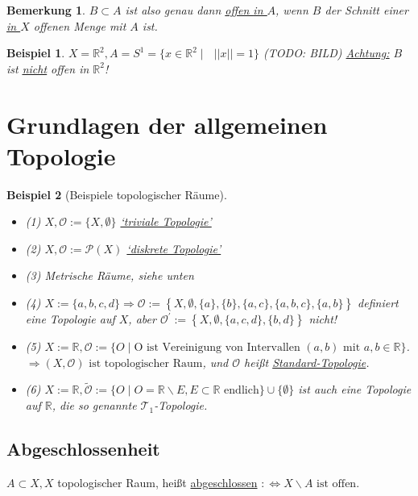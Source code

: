 \documentclass[a4paper,11pt,notitlepage]{report}
\newtheorem{definition}{Definition}[chapter]
\newtheorem{remark}{Bemerkung}[chapter]
\newtheorem{example}{Beispiel}[chapter]
\newcommand{\R}{{\ensuremath{\mathbb{R}}}}
\newcommand{\OO}{{\ensuremath{\mathcal{O}}}}
\newenvironment{Kasten}[1]
{
\hspace{0.05\linewidth}
\begin{center}
\begin{minipage}{0.9\linewidth}
\setlength{\fboxsep}{18pt}
\definecolor{shadecolor}{gray}{0.9}
\definecolor{framecolor}{gray}{0}
\def\FrameCommand{\fcolorbox{framecolor}{shadecolor}}
\MakeFramed {\FrameRestore}
\subsection{#1}
\begin{itshape}
}
{
\end{itshape}
\endMakeFramed
\end{minipage}
\end{center}
\vspace{1em}
}
\begin{document}
\begin{remark}
$B \subset A$ ist also genau dann \underline{offen \underline{in $A$}}, wenn $B$ der Schnitt einer \underline{in $X$} offenen Menge mit $A$ ist.
\end{remark}

\begin{example}
$X = \R^2, A = S^1 = \{ x \in \R^2 \mid \text{ } ||x|| = 1\}$ 
\newline
(TODO: BILD)
\newline
\underline{Achtung:} $B$ ist \underline{\underline{nicht}} offen in $\R^2$!
\end{example}

\section{Grundlagen der allgemeinen Topologie}
\begin{example}[Beispiele topologischer Räume]
	\begin{itemize}
		\item (1) $X, \OO := \{X, \emptyset\}$ \underline{`triviale Topologie'}
		\item (2) $X, \OO := \mathcal{P}(X)$ \underline{`diskrete Topologie'}
		\item (3) Metrische Räume, siehe unten
		\item (4) $X:= \{a,b,c,d\} \Rightarrow \OO := \left\{X, \emptyset, \{a\}, \{b\}, \{a,c\}, \{a,b,c\}, \{a,b\} \right \}$ definiert eine Topologie auf $X$, aber $\OO^\prime:= \left \{ X, \emptyset, \{a,c,d\}, \{b,d\} \right \}$ nicht!
		\item (5) $X := \R, \OO := \{O \mid \text{O ist Vereinigung von Intervallen } (a,b) \text{ mit } a,b \in \R\}$. $\Rightarrow (X, \OO) \text{ ist topologischer Raum}$, und $\OO$ heißt \underline{Standard-Topologie}.
		\item (6) $X:= \R, \tilde{\OO} := \{O \mid O = \R \backslash E, E \subset \R \text{ endlich}\} \cup \{\emptyset\}$ ist auch eine Topologie auf $\R$, die so genannte $\mathcal{T}_1$-Topologie.
	\end{itemize}
\end{example}

\begin{Kasten}{Abgeschlossenheit}
	$A \subset X, X$ topologischer Raum, heißt \underline{abgeschlossen} $:\Leftrightarrow X \backslash A \text{ ist offen}$.
\end{Kasten}
\end{document}
